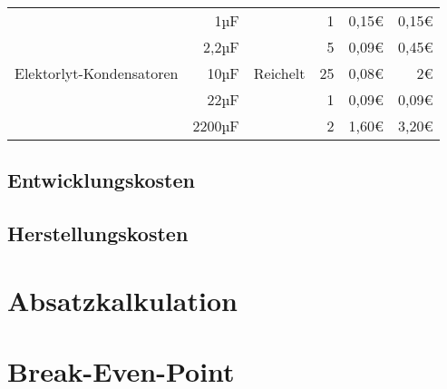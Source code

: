 \begin{table} [H]
\begin{tabularx}{\textwidth}{p{}|r|X|r|r|r}
	\hline
	\multirow{5}{*}{\parbox{0.166\textwidth}{Elektorlyt-Kondensatoren}}
	& 1µF	& \multirow{5}{*}{Reichelt}  & 1 & 	0,15€	& 0,15€ \\
	& 2,2µF	& 							 & 5 & 	0,09€	& 0,45€ \\
	& 10µF	& 							 & 25 & 0,08€	& 2€ \\
	& 22µF	& 							 & 1 & 	0,09€	& 0,09€ \\
	& 2200µF& 							 & 2 & 	1,60€	& 3,20€ \\
	
	
	\hline
	
%	
%	
%	
%
%	
%
%	
% 	
	
	
\end{tabularx}
\end{table}

\subsection{Entwicklungskosten}


\subsection{Herstellungskosten}


\section{Absatzkalkulation}


\section{Break-Even-Point}